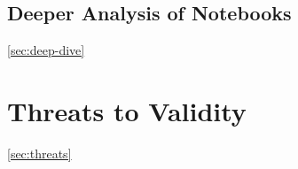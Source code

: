 \documentclass[acmsmall,screen,review,anonymous]{acmart}
\begin{document}
\subsection{Deeper Analysis of Notebooks}\ref{sec:deep-dive}
\section{Threats to Validity}\ref{sec:threats}

\end{document}
